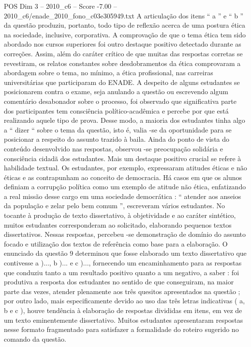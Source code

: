 \begin{textsample}{POS Dim 3 – 2010\_c6 – Score -7.00 – 2010\_c6/enade\_2010\_fono\_c03e305949.txt}
A articulação dos itens “ a ” e “ b ” da questão produziu, portanto, todo tipo de reflexão acerca de uma postura ética na sociedade, inclusive, corporativa.
A comprovação de que o tema ética tem sido abordado nos cursos superiores foi outro destaque positivo detectado durante as correções.
Assim, além do caráter crítico de que muitas das respostas corretas se revestiram, os relatos constantes sobre desdobramentos da ética comprovaram a abordagem sobre o tema, no mínimo, a ética profissional, nas carreiras universitárias que participaram do ENADE.
A despeito de alguns estudantes se posicionarem contra o exame, seja anulando a questão ou escrevendo algum comentário desabonador sobre o processo, foi observado que significativa parte dos participantes tem consciência político-acadêmica e percebe por que está realizando aquele tipo de prova.
Desse modo, a maioria dos estudantes tinha algo a “ dizer “ sobre o tema da questão, isto é, valia -se da oportunidade para se posicionar a respeito do assunto trazido à baila.
Ainda do ponto de vista do conteúdo desenvolvido nas respostas, observou -se preocupação solidária e consciência cidadã dos estudantes.
Mais um destaque positivo crucial se refere à habilidade textual.
Os estudantes, por exemplo, expressaram atitudes éticas e não éticas e as contrapunham ao conceito de democracia.
Há casos em que os alunos definiam a corrupção política como um exemplo de atitude não ética, enfatizando a real missão desse cargo em uma sociedade democrática : “ atender aos anseios da população e zelar pelo bem comum ”, escreveram vários estudantes.
No tocante à produção de texto dissertativo, à objetividade e ao caráter sintético, muitos estudantes corresponderam ao solicitado, elaborando pequenos textos dissertativos.
Nessas respostas, percebeu -se demonstração de domínio do assunto focado e utilização dos textos de referência como base para a elaboração.
O enunciado da questão 9 determinou que fosse elaborado um texto dissertativo que contivesse a )..., b )... e c )..., fornecendo um encaminhamento para as respostas que conduziu tanto a um resultado positivo quanto a um negativo, a saber : foi produtiva a resposta dos estudantes no sentido de que conseguiram, na maior parte das vezes, atender plenamente aos três quesitos apresentados na questão ; por outro lado, mais especificamente devido ao uso das três letras indicativas ( a, b e c ), houve tendência à elaboração de respostas divididas em itens, em vez de um texto eminentemente dissertativo.
Muitos estudantes apresentaram respostas nesse formato fragmentado para satisfazer a formalidade do roteiro sugerido no comando da questão.

\end{textsample}
